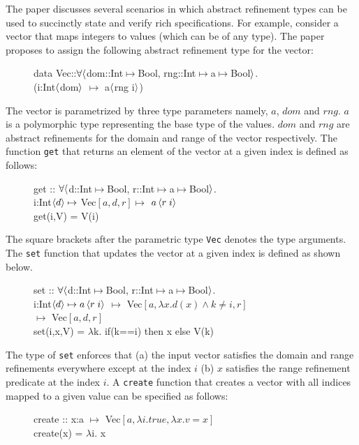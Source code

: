The paper discusses several scenarios in which abstract refinement types can be used to succinctly state and verify rich specifications. For example, consider a vector that maps integers to values (which can be of any type).
The paper proposes to assign the following abstract refinement type for the vector:
%
\begin{figure}[h]
\begin{myprogram}
data Vec::$\forall \langle$dom::Int$\mapsto$Bool, rng::Int$\mapsto$a$\mapsto$Bool$\rangle$. \\
\> (i:Int$\langle$dom$\rangle$ $\mapsto$ a$\langle$rng i$\rangle$)
\end{myprogram} 
\end{figure}
%
The vector is parametrized by three type parameters namely, $a$, $dom$ and $rng$.
$a$ is a polymorphic type representing the base type of the values.
$dom$ and $rng$ are abstract refinements for the domain and range of the vector respectively.
The function \texttt{get} that returns an element of the vector at a given index is defined as follows:
%
\begin{figure}[h]
\begin{myprogram}
get :: $\forall \langle$d::Int$\mapsto$Bool, r::Int$\mapsto$a$\mapsto$Bool$\rangle$. \\
\> \> i:Int$\left< d \right> \mapsto$ Vec$[a,d,r] \mapsto$ $a\left< r \; i \right>$ \\
\> get(i,V) = V(i)
\end{myprogram}
\end{figure}
%
The square brackets after the parametric type \texttt{Vec} denotes the type arguments.
The \texttt{set} function that updates the vector at a given index is defined as shown below.
%
\begin{figure}[h]
\begin{myprogram}
set :: $\forall \langle$d::Int$\mapsto$Bool, r::Int$\mapsto$a$\mapsto$Bool$\rangle$. \\
\> \> i:Int$\left< d \right> \mapsto a\left< r \; i \right>$ $\mapsto$ 
Vec$[a,\lambda x. d(x) \wedge k \ne i,r]$ \\
\> \> $\mapsto$ Vec$[a,d,r]$ \\
\> set(i,x,V) = $\lambda$k. if(k==i)  then x else V(k)
\end{myprogram}
\end{figure}
%
The type of \texttt{set} enforces that (a) the input vector satisfies the
domain and range refinements everywhere except at the index $i$ 
(b) $x$ satisfies the range refinement predicate at the index $i$.
A \texttt{create} function that creates a vector with all indices mapped 
to a given value can be specified as follows:
%
\begin{figure}[h]
\begin{myprogram}
create :: x:a $\mapsto$ Vec$[a,\lambda i.true,\lambda x. v = x]$  \\
\> create(x) = $\lambda$i. x
\end{myprogram}
\end{figure}


